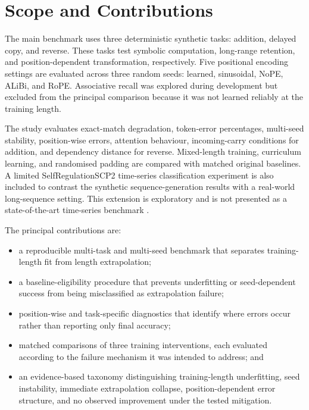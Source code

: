 \documentclass[
    author={Aanchala Ravindra Bhongade},
    supervisor={Dr. Fernando Moreno-Pino},
    degree={MSc},
    title={Length Generalisation in Transformer-Based Sequence Models: Failure Taxonomy and Mitigation Strategies},
    subtitle={},
    type={},
    year={2026}
]{dissertation}
\begin{document}
\section{Scope and Contributions}
\label{sec:scope_and_contributions}

The main benchmark uses three deterministic synthetic tasks: addition, delayed copy, and reverse. These tasks test symbolic computation, long-range retention, and position-dependent transformation, respectively. Five positional encoding settings are evaluated across three random seeds: learned, sinusoidal, NoPE, ALiBi, and RoPE. Associative recall was explored during development but excluded from the principal comparison because it was not learned reliably at the training length.

The study evaluates exact-match degradation, token-error percentages, multi-seed stability, position-wise errors, attention behaviour, incoming-carry conditions for addition, and dependency distance for reverse. Mixed-length training, curriculum learning, and randomised padding are compared with matched original baselines. A limited SelfRegulationSCP2 time-series classification experiment is also included to contrast the synthetic sequence-generation results with a real-world long-sequence setting. This extension is exploratory and is not presented as a state-of-the-art time-series benchmark \cite{morenopino2024rough}.

The principal contributions are:
\begin{itemize}
    \item a reproducible multi-task and multi-seed benchmark that separates training-length fit from length extrapolation;

    \item a baseline-eligibility procedure that prevents underfitting or seed-dependent success from being misclassified as extrapolation failure;

    \item position-wise and task-specific diagnostics that identify where errors occur rather than reporting only final accuracy;

    \item matched comparisons of three training interventions, each evaluated according to the failure mechanism it was intended to address; and

    \item an evidence-based taxonomy distinguishing training-length
    underfitting, seed instability, immediate extrapolation collapse, position-dependent error structure, and no observed improvement under the tested mitigation.
\end{itemize}
\end{document}

